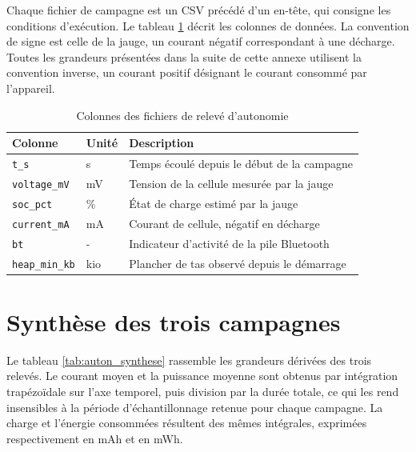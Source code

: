 Chaque fichier de campagne est un CSV précédé d'un en-tête, qui consigne les conditions d'exécution. Le tableau \ref{tab:auton_colonnes} décrit les colonnes de données. La convention de signe est celle de la jauge, un courant négatif correspondant à une décharge. Toutes les grandeurs présentées dans la suite de cette annexe utilisent la convention inverse, un courant positif désignant le courant consommé par l'appareil.

\begin{table}[H]
    \centering
    \caption{Colonnes des fichiers de relevé d'autonomie}
    \label{tab:auton_colonnes}
    \begin{tabular}{lll}
        \toprule
        Colonne                & Unité & Description                                 \\
        \midrule
        \texttt{t\_s}          & s     & Temps écoulé depuis le début de la campagne \\
        \texttt{voltage\_mV}   & mV    & Tension de la cellule mesurée par la jauge  \\
        \texttt{soc\_pct}      & \%    & État de charge estimé par la jauge          \\
        \texttt{current\_mA}   & mA    & Courant de cellule, négatif en décharge     \\
        \texttt{bt}            & -     & Indicateur d'activité de la pile Bluetooth  \\
        \texttt{heap\_min\_kb} & kio   & Plancher de tas observé depuis le démarrage \\
        \bottomrule
    \end{tabular}
\end{table}

\section{Synthèse des trois campagnes}
\label{ann:autonomie:synthese}

Le tableau \ref{tab:auton_synthese} rassemble les grandeurs dérivées des trois relevés. Le courant moyen et la puissance moyenne sont obtenus par intégration trapézoïdale sur l'axe temporel, puis division par la durée totale, ce qui les rend insensibles à la période d'échantillonnage retenue pour chaque campagne. La charge et l'énergie consommées résultent des mêmes intégrales, exprimées respectivement en mAh et en mWh.

